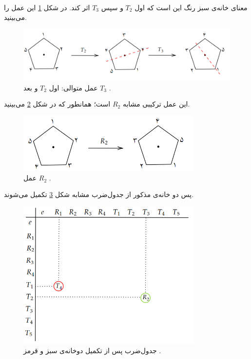 \documentclass[a4paper, 12pt]{article}
\begin{document}
\vspace{1em}
\noindent
معنای خانه‌ی سبز رنگ این است که اول
$T_2$ و سپس 
$T_3$
اثر کند. در شکل
\ref{secondex}
این عمل را می‌بینید.
\begin{figure}[h]
	\centering
	\includegraphics[width=35em]{7.png}
	\caption{عمل متوالی: اول 
		$T_2$ و بعد 
		$T_3$
		.
	}
	\label{secondex}
\end{figure}

\noindent
این عمل ترکیبی مشابه 
$R_2$
است؛ همانطور که در شکل 
\ref{secondex2}
می‌بینید.

\begin{figure}[h]
	\centering
	\includegraphics[width=25em]{8.png}
	\caption{عمل
		$R_2$
		.
	}
	\label{secondex2}
\end{figure}

\vspace{0.5em}
\noindent
پس دو خانه‌ی مذکور از جدول‌ضرب مشابه شکل 
\ref{prodtabsemi}
تکمیل می‌شوند.
\begin{figure}[h]
	\centering
	\includegraphics[width=25em]{9.png}
	\caption{جدول‌ضرب پس از تکمیل دوخانه‌ی سبز و قرمز	.
	}
	\label{prodtabsemi}
\end{figure}
\end{document}
